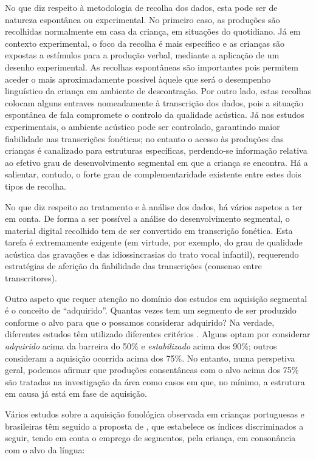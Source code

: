 \documentclass[output=paper]{LSP/langsci}
\begin{document}
No que diz respeito à metodologia de recolha dos dados, esta pode ser de natureza espontânea ou experimental. No primeiro caso, as produções são recolhidas normalmente em casa da criança, em situações do quotidiano. Já em contexto experimental, o foco da recolha é mais específico e as crianças são expostas a estímulos para a produção verbal, mediante a aplicação de um desenho experimental. As recolhas espontâneas são importantes pois permitem aceder o mais aproximadamente possível àquele que será o desempenho linguístico da criança em ambiente de descontração. Por outro lado, estas recolhas colocam alguns entraves nomeadamente à transcrição dos dados, pois a situação espontânea de fala compromete o controlo da qualidade acústica. Já nos estudos experimentais, o ambiente acústico pode ser controlado, garantindo maior fiabilidade nas transcrições fonéticas; no entanto o acesso às produções das crianças é canalizado para estruturas específicas, perdendo-se informação relativa ao efetivo grau de desenvolvimento segmental em que a criança se encontra. Há a salientar, contudo, o forte grau de complementaridade existente entre estes dois tipos de recolha.

No que diz respeito ao tratamento e à análise dos dados, há vários aspetos a ter em conta. De forma a ser possível a análise do desenvolvimento segmental, o material digital recolhido tem de ser convertido em transcrição fonética. Esta tarefa é extremamente exigente (em virtude, por exemplo, do grau de qualidade acústica das gravações e das idiossincrasias do trato vocal infantil), requerendo estratégias de aferição da fiabilidade das transcrições (consenso entre transcritores).

Outro aspeto que requer atenção no domínio dos estudos em aquisição segmental é o conceito de ``adquirido''. Quantas vezes tem um segmento de ser produzido conforme o alvo para que o possamos considerar adquirido? Na verdade, diferentes estudos têm utilizado diferentes critérios \citep{bernhardtstemberger1998}. Alguns optam por considerar \textit{adquirido} acima da barreira do 50\% e \textit{estabilizado} acima dos 90\%; outros consideram a aquisição ocorrida acima dos 75\%. No entanto, numa perspetiva geral, podemos afirmar que produções consentâneas com o alvo acima dos 75\% são tratadas na investigação da área como casos em que, no mínimo, a estrutura em causa já está em fase de aquisição.

Vários estudos sobre a aquisição fonológica observada em crianças portuguesas e brasileiras têm seguido a proposta de \citet{yavas_etal1991}, que estabelece os índices discriminados a seguir, tendo em conta o emprego de segmentos, pela criança, em consonância com o alvo da língua: 
\end{document}
